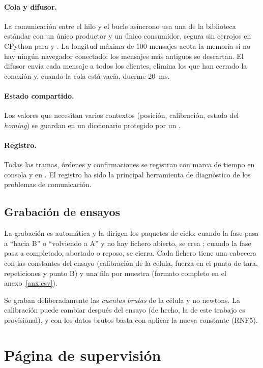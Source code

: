 \paragraph{Cola y difusor.} La comunicación entre el hilo y el bucle asíncrono usa una
 de la biblioteca estándar con un único productor y un único consumidor, segura sin cerrojos en
CPython para  y . La longitud máxima de 100 mensajes acota la memoria
si no hay ningún navegador conectado: los mensajes más antiguos se descartan. El difusor envía cada
mensaje a todos los clientes, elimina los que han cerrado la conexión y, cuando la cola está vacía,
duerme \SI{20}{\milli\second}.

\paragraph{Estado compartido.} Los valores que necesitan varios contextos (posición, calibración,
estado del \emph{homing}) se guardan en un diccionario protegido por un .

\paragraph{Registro.} Todas las tramas, órdenes y confirmaciones se registran con marca de tiempo en
consola y en . El registro ha sido la principal herramienta de diagnóstico
de los problemas de comunicación.

\subsection{Grabación de ensayos}

La grabación es automática y la dirigen los paquetes de ciclo: cuando la fase pasa a ``hacia B'' o
``volviendo a A'' y no hay fichero abierto, se crea ; cuando
la fase pasa a completado, abortado o reposo, se cierra. Cada fichero tiene una cabecera con las
constantes del ensayo (calibración de la célula, fuerza en el punto de tara, repeticiones y punto B)
y una fila por muestra (formato completo en el anexo~\ref{anx:csv}).

Se graban deliberadamente las \emph{cuentas brutas} de la célula y no newtons. La calibración puede
cambiar después del ensayo (de hecho, la de este trabajo es provisional), y con los datos brutos
basta con aplicar la nueva constante (RNF5).

\section{Página de supervisión}

